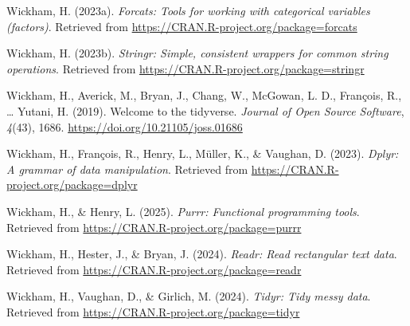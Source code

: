 \documentclass[
  man,floatsintext]{apa6}
\newlength{\cslhangindent}
\newenvironment{CSLReferences}[2] %
 {\begin{list}{}{%
  \setlength{\itemindent}{0pt}
  \setlength{\leftmargin}{0pt}
  \setlength{\parsep}{0pt}
  \ifodd #1
   \setlength{\leftmargin}{\cslhangindent}
   \setlength{\itemindent}{-1\cslhangindent}
  \fi
  \setlength{\itemsep}{#2\baselineskip}}}
 {\end{list}}
\begin{document}
\begin{CSLReferences}{1}{0}
Wickham, H. (2023a). \emph{Forcats: Tools for working with categorical variables (factors)}. Retrieved from \url{https://CRAN.R-project.org/package=forcats}

Wickham, H. (2023b). \emph{Stringr: Simple, consistent wrappers for common string operations}. Retrieved from \url{https://CRAN.R-project.org/package=stringr}

Wickham, H., Averick, M., Bryan, J., Chang, W., McGowan, L. D., François, R., \ldots{} Yutani, H. (2019). Welcome to the {tidyverse}. \emph{Journal of Open Source Software}, \emph{4}(43), 1686. \url{https://doi.org/10.21105/joss.01686}

Wickham, H., François, R., Henry, L., Müller, K., \& Vaughan, D. (2023). \emph{Dplyr: A grammar of data manipulation}. Retrieved from \url{https://CRAN.R-project.org/package=dplyr}

Wickham, H., \& Henry, L. (2025). \emph{Purrr: Functional programming tools}. Retrieved from \url{https://CRAN.R-project.org/package=purrr}

Wickham, H., Hester, J., \& Bryan, J. (2024). \emph{Readr: Read rectangular text data}. Retrieved from \url{https://CRAN.R-project.org/package=readr}

Wickham, H., Vaughan, D., \& Girlich, M. (2024). \emph{Tidyr: Tidy messy data}. Retrieved from \url{https://CRAN.R-project.org/package=tidyr}

\end{CSLReferences}
\end{document}
